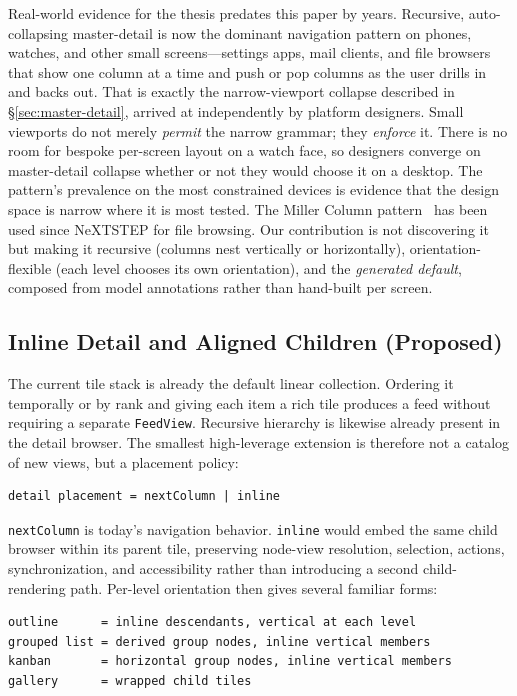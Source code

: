 \documentclass[sigplan,review,anonymous,10pt]{acmart}
\begin{document}
Real-world evidence for the thesis predates this paper by years. Recursive, auto-collapsing master-detail is now the dominant navigation pattern on phones, watches, and other small screens---settings apps, mail clients, and file browsers that show one column at a time and push or pop columns as the user drills in and backs out. That is exactly the narrow-viewport collapse described in \S\ref{sec:master-detail}, arrived at independently by platform designers. Small viewports do not merely \emph{permit} the narrow grammar; they \emph{enforce} it. There is no room for bespoke per-screen layout on a watch face, so designers converge on master-detail collapse whether or not they would choose it on a desktop. The pattern's prevalence on the most constrained devices is evidence that the design space is narrow where it is most tested. The Miller Column pattern~\cite{millercolumns} has been used since NeXTSTEP for file browsing. Our contribution is not discovering it but making it recursive (columns nest vertically or horizontally), orientation-flexible (each level chooses its own orientation), and the \emph{generated default}, composed from model annotations rather than hand-built per screen.

\subsection{Inline Detail and Aligned Children (Proposed)}
\label{sec:inline-proposed}

The current tile stack is already the default linear collection. Ordering it temporally or by rank and giving each item a rich tile produces a feed without requiring a separate \texttt{FeedView}. Recursive hierarchy is likewise already present in the detail browser. The smallest high-leverage extension is therefore not a catalog of new views, but a placement policy:

\begin{verbatim}
detail placement = nextColumn | inline
\end{verbatim}

\texttt{nextColumn} is today's navigation behavior. \texttt{inline} would embed the same child browser within its parent tile, preserving node-view resolution, selection, actions, synchronization, and accessibility rather than introducing a second child-rendering path. Per-level orientation then gives several familiar forms:

\begin{verbatim}
outline      = inline descendants, vertical at each level
grouped list = derived group nodes, inline vertical members
kanban       = horizontal group nodes, inline vertical members
gallery      = wrapped child tiles
\end{verbatim}
\end{document}
